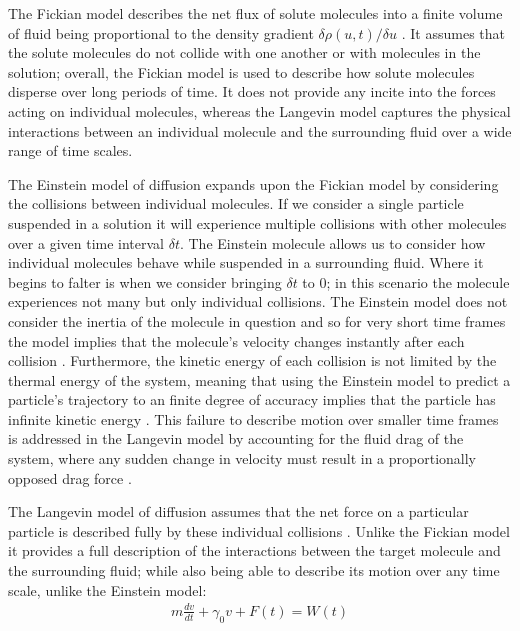 The Fickian model describes the net flux of solute molecules into a 
finite volume of fluid being proportional to the density gradient $\delta\rho(u,t)/\delta u$ \cite{Gillespie2012}. It assumes that the 
solute molecules do not collide with one another or with molecules in 
the solution; overall, the Fickian model is used to describe how solute 
molecules disperse over long periods of time. It does not provide any 
incite into the forces acting on individual molecules, whereas the 
Langevin model captures the physical interactions between an individual 
molecule and the surrounding fluid over a wide range of time scales.

The Einstein model of diffusion expands upon the Fickian model by 
considering the collisions between individual molecules. If we 
consider a single particle suspended in a solution it will experience 
multiple collisions with other molecules \cite{Gillespie2012a} over a 
given time interval $\delta t$. The Einstein molecule allows us to 
consider how individual molecules behave while suspended in a 
surrounding fluid. Where it begins to falter is when we consider 
bringing $\delta t$ to $0$; in this scenario the molecule experiences 
not many but only individual collisions. The Einstein model does not 
consider the inertia of the molecule in question and so for very short 
time frames the model implies that the molecule's velocity changes 
instantly after each collision \cite{Gillespie2012a,Gillespie2012b}. 
Furthermore, the kinetic energy of each collision is not limited by 
the thermal energy of the system, meaning that using the Einstein model 
to predict a particle's trajectory to an finite degree of accuracy 
implies that the particle has infinite kinetic energy \cite{Gillespie2012b}. 
This failure to describe motion over smaller time frames is addressed 
in the Langevin model by accounting for the fluid drag of the system, 
where any sudden change in velocity must result in a proportionally 
opposed drag force \cite{Gillespie2012c}. 

The Langevin model of diffusion assumes that the net force on a 
particular particle is described fully by these individual 
collisions \cite{Gillespie2012c}. Unlike the Fickian model it 
provides a full description of the interactions between the target 
molecule and the surrounding fluid; while also being able to 
describe its motion over any time scale, unlike the Einstein model:
\begin{align}
	m\frac{dv}{dt} + \gamma_0 v + F(t) = W(t)
\end{align}

